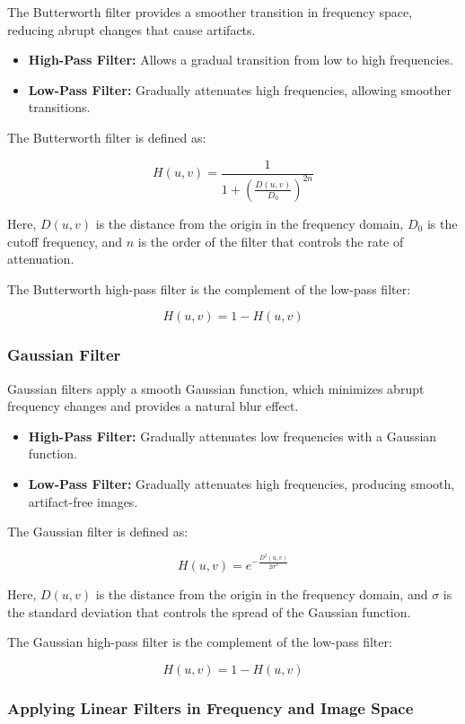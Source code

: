 \documentclass[a4paper,12pt]{article}
\begin{document}
The Butterworth filter provides a smoother transition in frequency space, reducing abrupt changes that cause artifacts.
\begin{itemize}
    \item \textbf{High-Pass Filter:} Allows a gradual transition from low to high frequencies.
    \item \textbf{Low-Pass Filter:} Gradually attenuates high frequencies, allowing smoother transitions.
\end{itemize}

The Butterworth filter is defined as:

\[
    H(u, v) = \frac{1}{1 + \left( \frac{D(u, v)}{D_0} \right)^{2n}}
\]

Here, \( D(u, v) \) is the distance from the origin in the frequency domain, \( D_0 \) is the cutoff frequency, and \( n \) is the order of the filter that controls the rate of attenuation.

The Butterworth high-pass filter is the complement of the low-pass filter:

\[
    H(u, v) = 1 - H(u, v)
\]

\subsubsection{Gaussian Filter}

Gaussian filters apply a smooth Gaussian function, which minimizes abrupt frequency changes and provides a natural blur effect.
\begin{itemize}
    \item \textbf{High-Pass Filter:} Gradually attenuates low frequencies with a Gaussian function.
    \item \textbf{Low-Pass Filter:} Gradually attenuates high frequencies, producing smooth, artifact-free images.
\end{itemize}

The Gaussian filter is defined as:

\[
    H(u, v) = e^{-\frac{D^2(u, v)}{2 \sigma^2}}
\]

Here, \( D(u, v) \) is the distance from the origin in the frequency domain, and \( \sigma \) is the standard deviation that controls the spread of the Gaussian function.

The Gaussian high-pass filter is the complement of the low-pass filter:

\[
    H(u, v) = 1 - H(u, v)
\]

\subsubsection{Applying Linear Filters in Frequency and Image Space}
\end{document}
